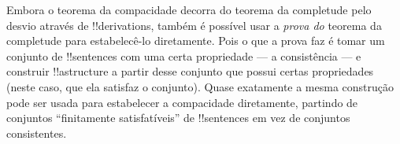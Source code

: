 \documentclass[../../../include/open-logic-section]{subfiles}
\begin{document}
Embora o teorema da compacidade decorra do teorema da completude
pelo desvio através de !!{derivation}s, também é possível usar a
\emph{prova do} teorema da completude para estabelecê-lo
diretamente. Pois o que a prova faz é tomar um conjunto de !!{sentence}s
com uma certa propriedade --- a consistência --- e construir
!!a{structure} a partir desse conjunto que possui certas propriedades
(neste caso, que ela satisfaz o conjunto). Quase exatamente a mesma
construção pode ser usada para estabelecer a compacidade diretamente,
partindo de conjuntos ``finitamente satisfatíveis'' de !!{sentence}s em
vez de conjuntos consistentes.
\end{document}
